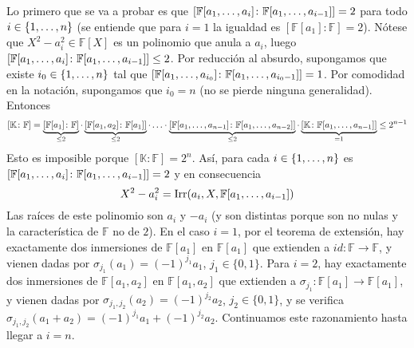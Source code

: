 \documentclass[11pt]{report}
\makeatletter
\renewenvironment{proof}[1][\proofname]{\par
  \pushQED{\qed}%
  \normalfont \topsep\z@skip %
  \trivlist
  \item[\hskip\labelsep
        \itshape
    #1\@addpunct{.}]\ignorespaces
}{%
  \popQED\endtrivlist\@endpefalse
}
\newcommand{\F}{\mathbb F}
\newcommand{\K}{\mathbb K}
\makeatother
\begin{document}
\begin{proof}
Lo primero que se va a probar es que $[\F[a_1,\mathellipsis,a_i] \colon \F[a_1,\mathellipsis,a_{i-1}]] = 2$ para todo $i \in \{1,\mathellipsis,n\}$ (se entiende que para $i=1$ la igualdad es $[\F[a_1] \colon \F] = 2$). Nótese que $X^2-a_i^2 \in \F[X]$ es un polinomio que anula a $a_i$, luego $[\F[a_1,\mathellipsis,a_i] \colon \F[a_1,\mathellipsis,a_{i-1}]] \leq 2$. Por reducción al absurdo, supongamos que existe $i_0 \in \{1,\mathellipsis, n\}$ tal que $[\F[a_1,\mathellipsis,a_{i_0}] \colon \F[a_1,\mathellipsis,a_{i_0-1}]] = 1$. Por comodidad en la notación, supongamos que $i_0 = n$ (no se pierde ninguna generalidad). Entonces
\[[\K \colon \F] = \underbrace{[\F[a_1] \colon \F]}_{\leq 2} \cdot \underbrace{[\F[a_1,a_2] \colon \F[a_1]]}_{\leq 2} \cdot \mathellipsis \cdot \underbrace{[\F[a_1,\mathellipsis,a_{n-1}] \colon \F[a_1,\mathellipsis,a_{n-2}]]}_{\leq 2} \cdot \underbrace{[\K \colon \F[a_1,\mathellipsis,a_{n-1}]]}_{=1}\leq 2^{n-1}\]
Esto es imposible porque $[\K \colon \F] = 2^n$. Así, para cada $i \in \{1,\mathellipsis,n\}$ es $[\F[a_1,\mathellipsis,a_i] \colon \F[a_1,\mathellipsis,a_{i-1}]] = 2$ y en consecuencia \[X^2-a_i^2 = \textup{Irr}(a_i,X,\F[a_1,\mathellipsis,a_{i-1}])\] 
Las raíces de este polinomio son $a_i$ y $-a_i$ (y son distintas porque son no nulas y la característica de $\F$ no de $2$). En el caso $i = 1$, por el teorema de extensión, hay exactamente dos inmersiones de $\F[a_1]$ en $\F[a_1]$ que extienden a $id \colon \F \to \F$, y vienen dadas por $\sigma_{j_1}(a_1) = (-1)^{j_1}a_1$, $j_1 \in \{0,1\}$. Para $i = 2$, hay exactamente dos inmersiones de $\F[a_1,a_2]$ en $\F[a_1,a_2]$ que extienden a $\sigma_{j_1} \colon \F[a_1] \to \F[a_1]$, y vienen dadas por $\sigma_{j_1,j_2}(a_2) = (-1)^{j_2}a_2$, $j_2 \in \{0,1\}$, y se verifica $\sigma_{j_1,j_2}(a_1+a_2) = (-1)^{j_1}a_1+(-1)^{j_2}a_2$. Continuamos este razonamiento hasta llegar a $i = n$.

\begin{center}
\end{center}


\end{proof}
\end{document}
